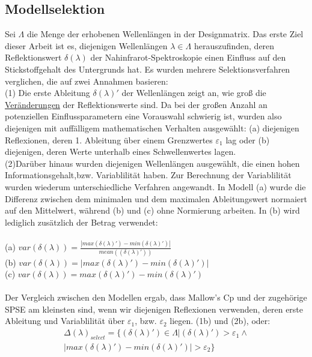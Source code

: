 	\subsection{Modellselektion}
	\label{ssec:modellselektion}
	Sei $\Lambda$ die Menge der erhobenen Wellenlängen in der Designmatrix.
	Das erste Ziel dieser Arbeit ist es, diejenigen Wellenlängen $\lambda\in\Lambda$ herauszufinden, deren Reflektionswert $\delta(\lambda)$ der Nahinfrarot-Spektroskopie einen Einfluss auf den Stickstoffgehalt des Untergrunds hat.  Es wurden mehrere Selektionsverfahren verglichen, die auf zwei Annahmen basieren: \\
	(1) Die erste Ableitung $\delta(\lambda)'$ der Wellenlängen zeigt an, wie groß die \underline{Veränderungen} der Reflektionswerte sind. Da bei der großen Anzahl an potenziellen Einflussparametern eine Vorauswahl schwierig ist, wurden also diejenigen mit auffälligem mathematischen Verhalten ausgewählt: (a) diejenigen Reflexionen, deren 1. Ableitung über einem Grenzwertes $\varepsilon_1$ lag oder (b) diejenigen, deren Werte unterhalb eines Schwellenwertes lagen.\\
	(2)Darüber hinaus wurden diejenigen Wellenlängen ausgewählt, die einen hohen Informationsgehalt,bzw. Variablilität haben. Zur Berechnung der Variablilität wurden wiederum unterschiedliche Verfahren angewandt. In Modell (a) wurde die Differenz zwischen dem minimalen und dem maximalen Ableitungswert normaiert auf den Mittelwert, während (b) und (c) ohne Normierung arbeiten. In (b) wird lediglich zusätzlich der Betrag verwendet: 	\\ \\
	(a) $var(\delta(\lambda)) = \frac{|max(\delta(\lambda)') - min(\delta(\lambda)')|}{mean((\delta(\lambda)'))}$\\
	(b) $var(\delta(\lambda)) = |max(\delta(\lambda)') - min(\delta(\lambda)')|$\\
	(c) $var(\delta(\lambda)) = max(\delta(\lambda)') - min(\delta(\lambda)')$\\ \\
	Der Vergleich zwischen den Modellen ergab, dass Mallow's Cp und der zugehörige SPSE am kleinsten sind, wenn wir diejenigen Reflexionen verwenden, deren erste Ableitung und Variablilität über $\varepsilon_1$, bzw. $\varepsilon_2$ liegen. (1b) und (2b), oder:
	\begin{align*}
		\varDelta(\lambda)_{select} = \{(\delta(\lambda)') \in \Lambda | (\delta(\lambda)') > \varepsilon_1 \wedge \\|max(\delta(\lambda)') - min(\delta(\lambda)')| > \varepsilon_2\}
	\end{align*}


